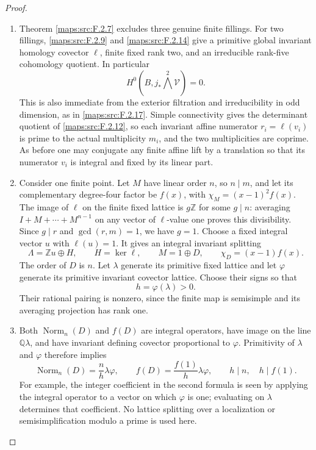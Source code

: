\begin{proof}
\begin{enumerate}[label=\arabic*.]
\item Theorem \ref{maps:src:F.2.7} excludes three genuine finite fillings.
For two fillings, \ref{maps:src:F.2.9} and \ref{maps:src:F.2.14} give a primitive global
invariant homology covector $\ell$, finite fixed rank two,
and an irreducible rank-five cohomology quotient.
In particular
\[
 H^0(B,j_*\bigwedge^2\mathcal V)=0.
 \tag{F.S2}\label{maps:eq:F.S2}
\]
This is also immediate from the exterior filtration and
irreducibility in odd dimension, as in \ref{maps:src:F.2.17}.
Simple connectivity gives the determinant quotient of
\ref{maps:src:F.2.12}, so each invariant affine numerator $r_i=\ell(v_i)$
is prime to the actual multiplicity $m_i$, and the two
multiplicities are coprime.
As before one may conjugate any finite affine lift by a
translation so that its numerator $v_i$ is integral and
fixed by its linear part.

\item Consider one finite point.  Let $M$ have linear order $n$,
so $n\mid m$, and let its complementary degree-four factor
be $f(x)$, with
$\chi_M=(x-1)^2f(x)$.
The image of $\ell$ on the finite fixed lattice is $g\mathbb Z$
for some $g\mid n$: averaging $I+M+\cdots+M^{n-1}$ on
any vector of $\ell$-value one proves this divisibility.
Since $g\mid r$ and $\gcd(r,m)=1$, we have $g=1$.
Choose a fixed integral vector $u$ with $\ell(u)=1$.
It gives an integral invariant splitting
\[
 \Lambda=\mathbb Zu\oplus H,
 \qquad H=\ker\ell,\qquad M=1\oplus D,
 \qquad\chi_D=(x-1)f(x).
 \tag{F.S3}\label{maps:eq:F.S3}
\]
The order of $D$ is $n$.
Let $\lambda$ generate its primitive fixed lattice and
let $\varphi$ generate its primitive invariant covector
lattice.  Choose their signs so that
\[
 h=\varphi(\lambda)>0.
 \tag{F.S4}\label{maps:eq:F.S4}
\]
Their rational pairing is nonzero, since the finite map
is semisimple and its averaging projection has rank one.

\item Both $\operatorname{Norm}_n(D)$ and $f(D)$ are integral
operators, have image on the line $\mathbb Q\lambda$,
and have invariant defining covector proportional to
$\varphi$.  Primitivity of $\lambda$ and $\varphi$
therefore implies
\[
 \operatorname{Norm}_n(D)=\frac n h\lambda\varphi,
 \qquad
 f(D)=\frac{f(1)}h\lambda\varphi,
 \qquad h\mid n,\quad h\mid f(1).
 \tag{F.S5}\label{maps:eq:F.S5}
\]
For example, the integer coefficient in the second formula
is seen by applying the integral operator to a vector on
which $\varphi$ is one; evaluating on $\lambda$ determines
that coefficient.  No lattice splitting over a localization
or semisimplification modulo a prime is used here.


\end{enumerate}
\end{proof}

